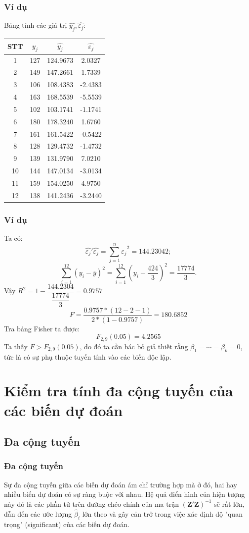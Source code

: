 \begin{frame}
\frametitle{Ví dụ}
Bảng tính các giá trị $\widehat{y_j}, \widehat{\varepsilon_j}$: 
\begin{center}
    \begin{tabular}{|c|c|c|c|}
    \hline 
    STT & $y_j$ & $\widehat{y_j}$ & $\widehat{\varepsilon_j}$ \\
    \hline 
    1  & 127 & 124.9673 & 2.0327 \\
    2  & 149 & 147.2661 & 1.7339 \\
    3  & 106 & 108.4383 & -2.4383 \\
    4  & 163 & 168.5539 & -5.5539 \\
    5  & 102 & 103.1741 & -1.1741 \\
    6  & 180 & 178.3240 & 1.6760 \\
    7  & 161 & 161.5422 & -0.5422 \\
    8  & 128 & 129.4732 & -1.4732 \\
    9  & 139 & 131.9790 & 7.0210 \\
    10 & 144 & 147.0134 & -3.0134 \\
    11 & 159 & 154.0250 & 4.9750 \\
    12 & 138 & 141.2436 & -3.2440 \\
    \hline
\end{tabular}
\end{center}
\end{frame}
\begin{frame}
\frametitle{Ví dụ}
Ta có:
\[\widehat{\varepsilon_j}'\widehat{\varepsilon_j}=\sum\limits_{j = 1}^n{\widehat{\varepsilon_j}^2} = 144.23042;
\]
\[
\sum_{i=1}^{12}(y_i - \overline{y})^2 =  \sum_{i=1}^{12}\left(y_i - \dfrac{424}{3}\right)^2 = \dfrac{17774}{3}.
\] 
Vậy $R^2 = 1 - \dfrac{144.2304}{\dfrac{17774}{3}} = 0.9757$
$$F = \dfrac{0.9757 * (12-2-1)}{2*(1-0.9757)} = 180.6852$$
Tra bảng Fisher ta được: $$F_{2,9}(0.05)=4.2565$$
Ta thấy $F > F_{2,9}(0.05)$, do đó ta cần bác bỏ giả thiết rằng $\beta_1 = \cdots = \beta_k = 0$, tức là có sự phụ thuộc tuyến tính vào các biến độc lập.
\end{frame}
\section{Kiểm tra tính đa cộng tuyến của các biến dự đoán}
\subsection{Đa cộng tuyến}
\begin{frame}
\frametitle{Đa cộng tuyến}
Sự đa cộng tuyến giữa các biến dự đoán ám chỉ trường hợp mà ở đó, hai hay nhiều biến dự đoán có sự ràng buộc với nhau. Hệ quả điển hình của hiện tượng này đó là các phần tử trên đường chéo chính của ma trận $(\textbf{Z}'\textbf{Z})^{-1}$ sẽ rất lớn, dẫn đến các ước lượng $\widehat{\beta}_i$ lớn theo và gây cản trở trong việc xác định độ "quan trọng" (significant) của các biến dự đoán.
\end{frame}
